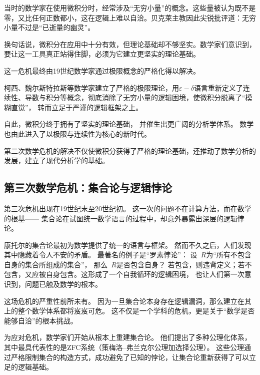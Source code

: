 当时的数学家在使用微积分时，经常涉及“无穷小量”的概念。这些量被认为既不是零，又比任何正数都小，这在逻辑上难以自洽。贝克莱主教因此尖锐批评道：无穷小量不过是“已逝量的幽灵”。 

换句话说，微积分在应用中十分有效，但理论基础却不够坚实。数学家们意识到，要让这一工具真正站得住脚，必须为它建立更坚实的理论基础。




这一危机最终由19世纪数学家通过极限概念的严格化得以解决。

柯西、魏尔斯特拉斯等数学家建立了严格的极限理论，用$\varepsilon-\delta$语言重新定义了连续性、导数与积分等概念，彻底消除了无穷小量的逻辑困境，使微积分脱离了“模糊直觉”，  转而立足于严谨的逻辑框架之上。



自此，微积分终于拥有了坚实的理论基础，  
并催生出更广阔的分析学体系。  
数学也由此进入了以极限与连续性为核心的新时代。  


第二次数学危机的解决不仅使微积分获得了严格的理论基础，还推动了数学分析的发展，建立了现代分析学的基础。

\subsection{第三次数学危机：集合论与逻辑悖论}

第三次危机出现在19世纪末至20世纪初。  
这一次的问题不在计算方法，而在数学的根基——  
集合论在试图统一数学语言的过程中，却意外暴露出深层的逻辑悖论。






康托尔的集合论最初为数学提供了统一的语言与框架。  
然而不久之后，人们发现其中隐藏着令人不安的矛盾。  
最著名的例子是“罗素悖论”：  
设~$R$为“所有不包含自身的集合所组成的集合”，  
那么~$R$是否包含自身？  
若包含，则违背定义；若不包含，又应被自身包含。这形成了一个自我循环的逻辑困境，  
也让人们第一次意识到，问题已触及数学的根本。






这场危机的严重性前所未有。  
因为一旦集合论本身存在逻辑漏洞，那么建立在其上的整个数学体系都将岌岌可危。  
这不仅是一个学科的危机，更是关于“数学是否能够自洽”的根本挑战。






为应对危机，数学家们开始从根本上重建集合论。  
他们提出了多种公理化体系，其中最具代表性的是ZFC系统（策梅洛–弗兰克尔公理加选择公理）。  
这些公理通过严格限制集合的构造方式，成功避免了已知的悖论，让集合论重新获得了可以立足的逻辑基础。






